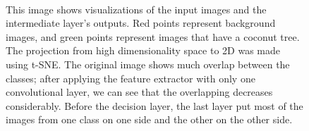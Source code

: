 \documentclass[a4paper,conference]{IEEEtran}
\begin{document}
\begin{figure}
  \centering
  ~
  \\
  \caption{This image shows visualizations of the input images and the intermediate layer's outputs. Red points represent background images, and green points represent images that have a coconut tree. The projection from high dimensionality space to 2D was made using t-SNE. The original image shows much overlap between the classes; after applying the feature extractor with only one convolutional layer, we can see that the overlapping decreases considerably. Before the decision layer, the last layer put most of the images from one class on one side and the other on the other side.}
\end{figure}
\end{document}
